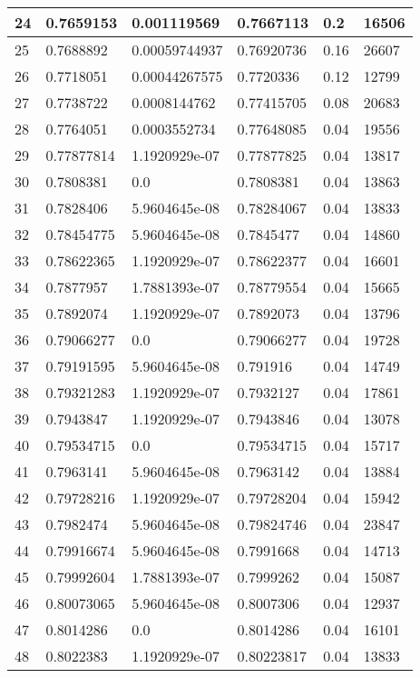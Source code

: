 \begin{longtable}{|l|l|l|l|l|l|}
24 & 0.7659153 & 0.001119569 & 0.7667113 & 0.2 & 16506 \\ \hline 
25 & 0.7688892 & 0.00059744937 & 0.76920736 & 0.16 & 26607 \\ \hline 
26 & 0.7718051 & 0.00044267575 & 0.7720336 & 0.12 & 12799 \\ \hline 
27 & 0.7738722 & 0.0008144762 & 0.77415705 & 0.08 & 20683 \\ \hline 
28 & 0.7764051 & 0.0003552734 & 0.77648085 & 0.04 & 19556 \\ \hline 
29 & 0.77877814 & 1.1920929e-07 & 0.77877825 & 0.04 & 13817 \\ \hline 
30 & 0.7808381 & 0.0 & 0.7808381 & 0.04 & 13863 \\ \hline 
31 & 0.7828406 & 5.9604645e-08 & 0.78284067 & 0.04 & 13833 \\ \hline 
32 & 0.78454775 & 5.9604645e-08 & 0.7845477 & 0.04 & 14860 \\ \hline 
33 & 0.78622365 & 1.1920929e-07 & 0.78622377 & 0.04 & 16601 \\ \hline 
34 & 0.7877957 & 1.7881393e-07 & 0.78779554 & 0.04 & 15665 \\ \hline 
35 & 0.7892074 & 1.1920929e-07 & 0.7892073 & 0.04 & 13796 \\ \hline 
36 & 0.79066277 & 0.0 & 0.79066277 & 0.04 & 19728 \\ \hline 
37 & 0.79191595 & 5.9604645e-08 & 0.791916 & 0.04 & 14749 \\ \hline 
38 & 0.79321283 & 1.1920929e-07 & 0.7932127 & 0.04 & 17861 \\ \hline 
39 & 0.7943847 & 1.1920929e-07 & 0.7943846 & 0.04 & 13078 \\ \hline 
40 & 0.79534715 & 0.0 & 0.79534715 & 0.04 & 15717 \\ \hline 
41 & 0.7963141 & 5.9604645e-08 & 0.7963142 & 0.04 & 13884 \\ \hline 
42 & 0.79728216 & 1.1920929e-07 & 0.79728204 & 0.04 & 15942 \\ \hline 
43 & 0.7982474 & 5.9604645e-08 & 0.79824746 & 0.04 & 23847 \\ \hline 
44 & 0.79916674 & 5.9604645e-08 & 0.7991668 & 0.04 & 14713 \\ \hline 
45 & 0.79992604 & 1.7881393e-07 & 0.7999262 & 0.04 & 15087 \\ \hline 
46 & 0.80073065 & 5.9604645e-08 & 0.8007306 & 0.04 & 12937 \\ \hline 
47 & 0.8014286 & 0.0 & 0.8014286 & 0.04 & 16101 \\ \hline 
48 & 0.8022383 & 1.1920929e-07 & 0.80223817 & 0.04 & 13833 \\ \hline 

\end{longtable}
